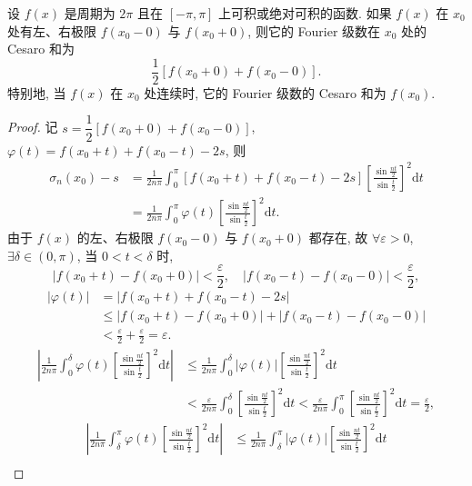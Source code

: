 \begin{theorem}[Fej\'er 定理]\label{thm:16.4.2}
设 $f(x)$ 是周期为 $2\pi$ 且在 $[-\pi,\pi]$ 上可积或绝对可积的函数. 如果 $f(x)$ 在 $x_{0}$ 处有左、右极限 $f(x_{0}-0)$ 与 $f(x_{0}+0)$, 则它的 Fourier 级数在 $x_{0}$ 处的 Cesaro 和为
\[
  \frac{1}{2}\left[f(x_{0}+0)+f(x_{0}-0)\right].
\]
特别地, 当 $f(x)$ 在 $x_{0}$ 处连续时, 它的 Fourier 级数的 Cesaro 和为 $f(x_{0})$.
\end{theorem}

\begin{proof}
记 $s=\dfrac{1}{2}[f(x_{0}+0)+f(x_{0}-0)]$, $\varphi(t)=f(x_{0}+t)+f(x_{0}-t)-2s$, 则
\begin{align*}
  \sigma_{n}(x_{0})-s&=\frac{1}{2n\pi}\int_{0}^{\pi}\left[f(x_{0}+t)+f(x_{0}-t)-2s\right]\left[\frac{\sin\frac{nt}{2}}{\sin\frac{t}{2}}\right]^{2}\mathrm{d}t\\
  &=\frac{1}{2n\pi}\int_{0}^{\pi}\varphi(t)\left[\frac{\sin\frac{nt}{2}}{\sin\frac{t}{2}}\right]^{2}\mathrm{d}t.
\end{align*}
由于 $f(x)$ 的左、右极限 $f(x_{0}-0)$ 与 $f(x_{0}+0)$ 都存在, 故 $\forall\varepsilon>0$, $\exists\delta\in(0,\pi)$, 当 $0<t<\delta$ 时,
\[
  |f(x_{0}+t)-f(x_{0}+0)|<\frac{\varepsilon}{2},\quad|f(x_{0}-t)-f(x_{0}-0)|<\frac{\varepsilon}{2},
\]
\begin{align*}
  |\varphi(t)|&=|f(x_{0}+t)+f(x_{0}-t)-2s|\\
  &\leqslant|f(x_{0}+t)-f(x_{0}+0)|+|f(x_{0}-t)-f(x_{0}-0)|\\
  &<\frac{\varepsilon}{2}+\frac{\varepsilon}{2}=\varepsilon.
\end{align*}
\begin{align*}
  \left|\frac{1}{2n\pi}\int_{0}^{\delta}\varphi(t)\left[\frac{\sin\frac{nt}{2}}{\sin\frac{t}{2}}\right]^{2}\mathrm{d}t\right|
  &\leqslant\frac{1}{2n\pi}\int_{0}^{\delta}|\varphi(t)|\left[\frac{\sin\frac{nt}{2}}{\sin\frac{t}{2}}\right]^{2}\mathrm{d}t\\
  &<\frac{\varepsilon}{2n\pi}\int_{0}^{\delta}\left[\frac{\sin\frac{nt}{2}}{\sin\frac{t}{2}}\right]^{2}\mathrm{d}t
  <\frac{\varepsilon}{2n\pi}\int_{0}^{\pi}\left[\frac{\sin\frac{nt}{2}}{\sin\frac{t}{2}}\right]^{2}\mathrm{d}t=\frac{\varepsilon}{2},
\end{align*}
\begin{align*}
  \left|\frac{1}{2n\pi}\int_{\delta}^{\pi}\varphi(t)\left[\frac{\sin\frac{nt}{2}}{\sin\frac{t}{2}}\right]^{2}\mathrm{d}t\right|
  &\leqslant\frac{1}{2n\pi}\int_{\delta}^{\pi}|\varphi(t)|\left[\frac{\sin\frac{nt}{2}}{\sin\frac{t}{2}}\right]^{2}\mathrm{d}t\\

\end{align*}
\end{proof}
